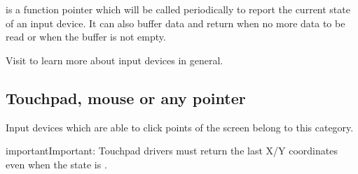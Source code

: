 \documentclass[letterpaper,10pt,english]{sphinxmanual}
\begin{document}
 is a function pointer which will be called periodically to report the current state of an input device.
It can also buffer data and return  when no more data to be read or  when the buffer is not empty.

Visit {\hyperref[\detokenize{overview/indev::doc}]{}} to learn more about input devices in general.


\subsection{Touchpad, mouse or any pointer}
\label{\detokenize{porting/indev:touchpad-mouse-or-any-pointer}}
Input devices which are able to click points of the screen belong to this category.

\begin{sphinxVerbatim}[commandchars=\\\{\}]
  
  


    
       
      
        
      
\end{sphinxVerbatim}

\begin{sphinxadmonition}{important}{Important:}
Touchpad drivers must return the last X/Y coordinates even when the state is .
\end{sphinxadmonition}
\end{document}
